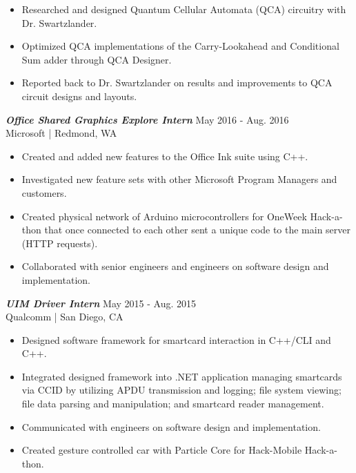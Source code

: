 \documentclass[letter]{res}
\begin{document}
\begin{resume}
 \vspace{-4mm}

 \begin{itemize}
 \item Researched and designed Quantum Cellular Automata (QCA) circuitry with Dr. Swartzlander.
 \item Optimized QCA implementations of the Carry-Lookahead and Conditional Sum adder through QCA Designer.
 \item Reported back to Dr. Swartzlander on results and improvements to QCA circuit designs and layouts.
 \end{itemize}
 
\vspace{-2mm}
   
{\sl \textbf{Office Shared Graphics Explore Intern}} \hfill May 2016 - Aug. 2016\\
Microsoft | Redmond, WA \newline
 \vspace{-4mm}
  \begin{itemize}
  \item Created and added new features to the Office Ink suite using C++.
  \item Investigated new feature sets with other Microsoft Program Managers and customers.
  \item Created physical network of Arduino microcontrollers for OneWeek Hack-a-thon that once connected to each other sent a unique code to the main server (HTTP requests).
  \item Collaborated with senior engineers and engineers on software design and implementation.
  \end{itemize}
  
\vspace{-2mm}

{\sl \textbf{UIM Driver Intern}} \hfill May 2015 - Aug. 2015\\
Qualcomm | San Diego, CA \newline
 
 \vspace{-4mm}
 
 \begin{itemize}
 \item Designed software framework for smartcard interaction in C++/CLI and C++.
 \item Integrated designed framework into .NET application managing smartcards via CCID by utilizing APDU transmission and logging; file system viewing; file data parsing and manipulation; and smartcard reader management.
 \item Communicated with engineers on software design and implementation.
 \item Created gesture controlled car with Particle Core for Hack-Mobile Hack-a-thon.
 \end{itemize}
 

\end{resume}
\end{document}

